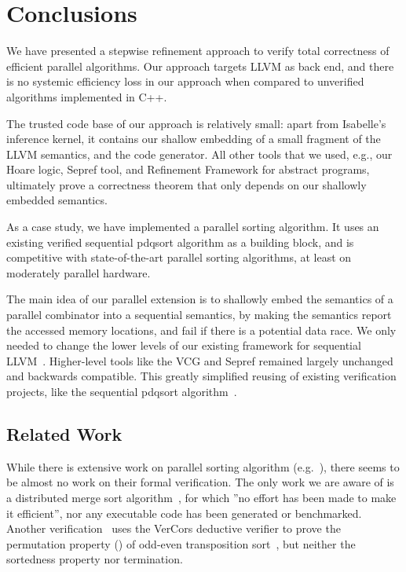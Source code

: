 \documentclass[a4paper,UKenglish,cleveref, autoref, thm-restate]{lipics-v2021}
\begin{document}
  \section{Conclusions}\label{sec:concl}
    We have presented a stepwise refinement approach to verify total correctness of efficient parallel algorithms.
    Our approach targets LLVM as back end, and there is no systemic efficiency loss in our approach
    when compared to unverified algorithms implemented in C++.

    The trusted code base of our approach is relatively small:
    apart from Isabelle's inference kernel, it contains our shallow embedding of a small fragment of
    the LLVM semantics, and the code generator.
    All other tools that we used, e.g., our Hoare logic, Sepref tool, and Refinement Framework for abstract programs,
    ultimately prove a correctness theorem that only depends on our shallowly embedded semantics.

    As a case study, we have implemented a parallel sorting algorithm.
    It uses an existing verified sequential pdqsort algorithm as a building block,
    and is competitive with state-of-the-art parallel sorting algorithms,
    at least on moderately parallel hardware.

    The main idea of our parallel extension is to shallowly embed the semantics of a
    parallel combinator into a sequential semantics, by making the
    semantics report the accessed memory locations, and fail if there is a potential data race.
    We only needed to change the lower levels of our existing framework for sequential LLVM~\cite{La19-llvm}.
    Higher-level tools like the VCG and Sepref remained largely unchanged and backwards compatible.
    This greatly simplified reusing of existing verification projects, like the sequential pdqsort algorithm~\cite{La20}.





    \subsection{Related Work}
    While there is extensive work on parallel sorting algorithm (e.g.~\cite{CNLM08,AMI21}),
    there seems to be almost no work on their formal verification. The only work we are aware of is
    a distributed merge sort algorithm~\cite{HKBK20}, for which ''no effort has been made to make it efficient''\cite[Sec.~2]{HKBK20},
    nor any executable code has been generated or benchmarked. Another verification~\cite{SaHu20} uses
    the VerCors deductive verifier to prove the permutation property ()
    of odd-even transposition sort~\cite{Ha72}, but neither the sortedness property nor termination.
\end{document}
